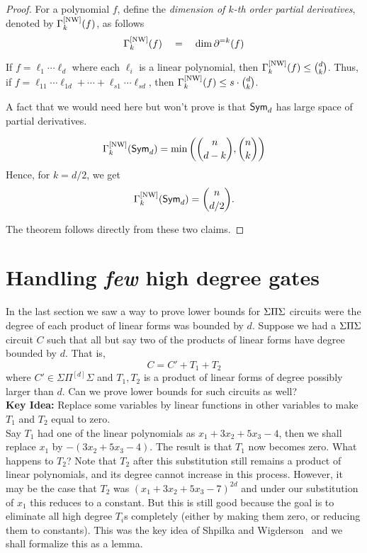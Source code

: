 \begin{proof}
For a polynomial $f$, define the \emph{dimension of $k$-th order partial derivatives}, denoted by $\Gamma^{\mathrm{[NW]}}_k(f)$, as follows
\[
\Gamma^{\mathrm{[NW]}}_k(f) \quad = \quad \dim \partial^{=k}(f)
\]
\begin{claim}\label{claim:d3-nw-upperbound}
  If $f = \ell_1 \cdots \ell_d$ where each $\ell_i$ is a linear polynomial, then $\Gamma^{\mathrm{[NW]}}_k(f) \leq \binom{d}{k}$. 
  Thus, if $f = \ell_{11}\cdots \ell_{1d} + \cdots + \ell_{s1}\cdots \ell_{sd}$, then $\Gamma^{\mathrm{[NW]}}_k(f) \leq s \cdot \binom{d}{k}$. 
\end{claim}

\noindent
A fact that we would need here but won't prove is that $\operatorname{\mathsf{Sym}}_d$ has large space of partial derivatives. 

\begin{claim}
\[
\Gamma^{\mathrm{[NW]}}_k(\operatorname{\mathsf{Sym}}_d) = \min\left(\binom{n}{d-k}, \binom{n}{k}\right)
\]
Hence, for $k = d/2$, we get 
\[
\Gamma^{\mathrm{[NW]}}_k(\operatorname{\mathsf{Sym}}_d) = \binom{n}{d/2}.
\]
\end{claim}

\noindent 
The theorem follows directly from these two claims. \qedhere
\end{proof}

\section{Handling \emph{few} high degree gates}

In the last section we saw a way to prove lower bounds for $\Sigma\Pi\Sigma$ circuits were the degree of each product of linear forms was bounded by $d$. Suppose we had a $\Sigma\Pi\Sigma$ circuit $C$ such that all but say two of the products of linear forms have degree bounded by $d$. That is,
\[
C = C' + T_1 + T_2
\]
where $C' \in \Sigma\Pi^{[d]}\Sigma$ and  $T_1,T_2$ is a product of linear forms of degree possibly larger than $d$. Can we prove lower bounds for such circuits as well? \\

{\bf Key Idea: } Replace some variables by linear functions in other variables to make $T_1$ and $T_2$ equal to zero. \\

Say $T_1$ had one of the linear polynomials as $x_1 + 3x_2 + 5x_3 - 4$, then we shall replace $x_1$ by $- (3x_2 + 5x_3 - 4)$.
The result is that $T_1$ now becomes zero.
What happens to $T_2$?
Note that $T_2$ after this substitution still remains a product of linear polynomials, and its degree cannot increase in this process.
However, it may be the case that $T_2$ was $(x_1 + 3x_2 + 5x_3 - 7)^{2d}$ and under our substitution of $x_1$ this reduces to a constant.
But this is still good because the goal is to eliminate all high degree $T_i$s completely (either by making them zero, or reducing them to constants).
This was the key idea of Shpilka and Wigderson~\cite{sw2001} and we shall formalize this as a lemma.

